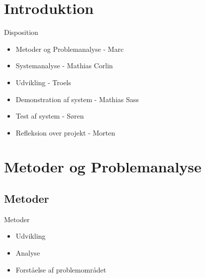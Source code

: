 \section{Introduktion}

\begin{frame}{Disposition}
\begin{itemize}
   \item Metoder og Problemanalyse - Marc
   \item Systemanalyse - Mathias Corlin
   \item Udvikling - Troels
   \item Demonstration af system - Mathias Sass
   \item Test af system - Søren
   \item Refleksion over projekt - Morten
\end{itemize}
\end{frame}

\section{Metoder og Problemanalyse}
\subsection{Metoder}
\begin{frame}{Metoder}
\begin{itemize}
   \item Udvikling
   \item Analyse
   \item Forståelse af problemområdet
\end{itemize}
\end{frame}

